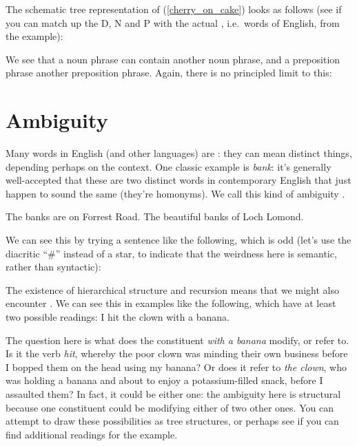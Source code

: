 \documentclass{article}
\begin{document}
The schematic tree representation of (\ref{cherry_on_cake}) looks as follows (see if you can match up the  D, N and P with the actual , i.e.~words of English, from the example):
\begin{exe}
\end{exe}
We see that a noun phrase can contain another noun phrase, and a preposition phrase another preposition phrase.
Again, there is no principled limit to this:
\begin{exe}
\end{exe}

\section{Ambiguity}
Many words in English (and other languages) are : they can mean distinct things, depending perhaps on the context. One classic example is \emph{bank}: it's generally well-accepted that these are two distinct words in contemporary English that just happen to sound the same (they're homonyms). We call this kind of ambiguity .

\ea
    \ea The banks are on Forrest Road.
    \ex The beautiful banks of Loch Lomond.
    \z
\z

We can see this by trying a sentence like the following, which is odd (let's use the diacritic ``\#'' instead of a star, to indicate that the weirdness here is semantic, rather than syntactic):
\z

The existence of hierarchical structure and recursion means that we might also encounter . We can see this in examples like the following, which have at least two possible readings:
\ea I hit the clown with a banana.
\z

The question here is what does the constituent \emph{with a banana} modify, or refer to. Is it the verb \emph{hit}, whereby the poor clown was minding their own business before I bopped them on the head using my banana? Or does it refer to \emph{the clown}, who was holding a banana and about to enjoy a potassium-filled snack, before I assaulted them? In fact, it could be either one: the ambiguity here is structural because one constituent could be modifying either of two other ones. You can attempt to draw these possibilities as tree structures, or perhaps see if you can find additional readings for the example.
\end{document}
